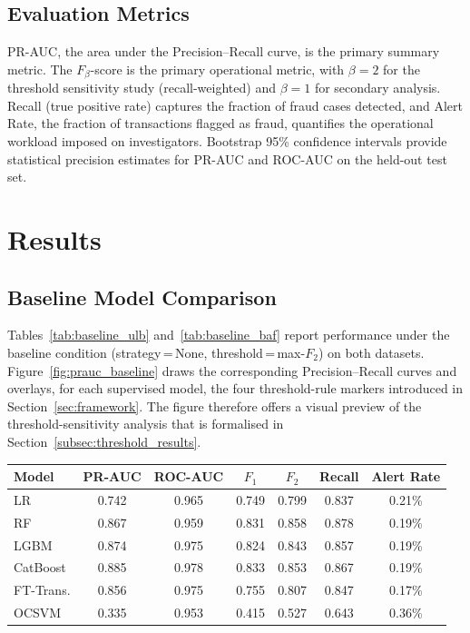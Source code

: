 \documentclass[a4paper,fleqn]{cas-sc}
\begin{document}
\subsection{Evaluation Metrics}
\label{subsec:metrics}

PR-AUC, the area under the Precision--Recall curve, is the primary summary metric.
The $F_\beta$-score is the primary operational metric, with $\beta\!=\!2$ for the
threshold sensitivity study (recall-weighted) and $\beta\!=\!1$ for secondary analysis.
Recall (true positive rate) captures the fraction of fraud cases detected, and Alert
Rate, the fraction of transactions flagged as fraud, quantifies the operational workload
imposed on investigators. Bootstrap 95\% confidence intervals provide statistical
precision estimates for PR-AUC and ROC-AUC on the held-out test set.

\section{Results}
\label{sec:results}

\subsection{Baseline Model Comparison}
\label{subsec:baseline}

Tables~\ref{tab:baseline_ulb} and~\ref{tab:baseline_baf} report performance under the
baseline condition (strategy\,=\,None, threshold\,=\,max-$F_2$) on both datasets.
Figure~\ref{fig:prauc_baseline} draws the corresponding Precision--Recall curves and
overlays, for each supervised model, the four threshold-rule markers introduced in
Section~\ref{sec:framework}. The figure therefore offers a visual preview of the
threshold-sensitivity analysis that is formalised in
Section~\ref{subsec:threshold_results}.

\par\medskip\noindent\begin{minipage}{\linewidth}\centering
{}
\label{tab:baseline_ulb}
\begin{tabular}{l c c c c c c}
\toprule
Model & PR-AUC & ROC-AUC & $F_1$ & $F_2$ & Recall & Alert Rate \\
\midrule
LR         & 0.742 & 0.965 & 0.749 & 0.799 & 0.837 & 0.21\% \\
RF         & 0.867 & 0.959 & 0.831 & 0.858 & 0.878 & 0.19\% \\
LGBM       & 0.874 & 0.975 & 0.824 & 0.843 & 0.857 & 0.19\% \\
CatBoost   & 0.885 & 0.978 & 0.833 & 0.853 & 0.867 & 0.19\% \\
FT-Trans.  & 0.856 & 0.975 & 0.755 & 0.807 & 0.847 & 0.17\% \\
OCSVM      & 0.335 & 0.953 & 0.415 & 0.527 & 0.643 & 0.36\% \\
\bottomrule
\end{tabular}
\end{minipage}\par\medskip
\end{document}
